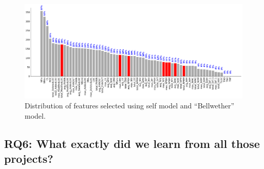 \documentclass[10pt,journal,compsoc]{IEEEtran}
\begin{document}



\begin{figure}[h]
    \centering
    \includegraphics[width=\linewidth]{figs/FSS_compare.png}
    \caption{Distribution of features selected using self model and ``Bellwether'' model.}
    \label{fig:FSS_compare}
\end{figure}

\subsection*{RQ6: What exactly did we learn from all those projects?}
\label{sec:rq6}
\end{document}
